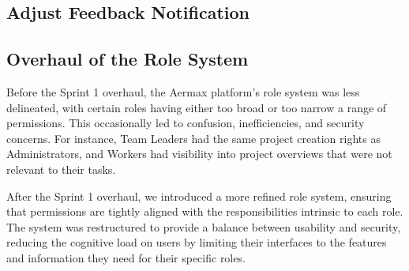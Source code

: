 \subsection{Adjust Feedback Notification}



\subsection{Overhaul of the Role System}
Before the Sprint 1 overhaul, the Aermax platform's role system was less delineated, with certain roles having either too broad or too narrow a range of permissions. This occasionally led to confusion, inefficiencies, and security concerns. For instance, Team Leaders had the same project creation rights as Administrators, and Workers had visibility into project overviews that were not relevant to their tasks.

After the Sprint 1 overhaul, we introduced a more refined role system, ensuring that permissions are tightly aligned with the responsibilities intrinsic to each role. The system was restructured to provide a balance between usability and security, reducing the cognitive load on users by limiting their interfaces to the features and information they need for their specific roles.

